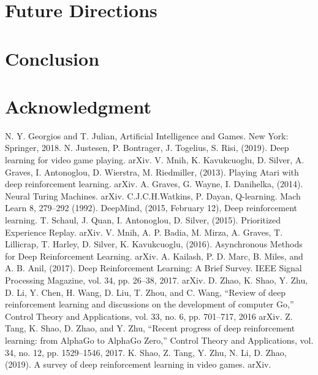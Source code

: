 \documentclass[conference]{IEEEtran}
\begin{document}
\section{Future Directions}


\section{Conclusion}


\section*{Acknowledgment}

\begin{thebibliography}{00}
      N. Y. Georgios and T. Julian, Artificial Intelligence and Games. New York: Springer, 2018.
      N. Justesen, P. Bontrager, J. Togelius, S. Risi, (2019). Deep learning for video game playing. arXiv.
      V. Mnih, K. Kavukcuoglu, D. Silver, A. Graves, I. Antonoglou, D. Wierstra, M. Riedmiller, (2013). Playing Atari with deep reinforcement learning. arXiv.
      A. Graves, G. Wayne, I. Danihelka, (2014). Neural Turing Machines. arXiv.
      C.J.C.H.Watkins, P. Dayan, Q-learning. Mach Learn 8, 279–292 (1992).
      DeepMind, (2015, February 12), Deep reinforcement learning.
      T. Schaul, J. Quan, I. Antonoglou, D. Silver, (2015). Prioritized Experience Replay. arXiv.
      V. Mnih, A. P. Badia, M. Mirza, A. Graves, T. Lillicrap, T. Harley, D. Silver, K. Kavukcuoglu, (2016). Asynchronous Methods for Deep Reinforcement Learning. arXiv.
      A. Kailash, P. D. Marc, B. Miles, and A. B. Anil, (2017). Deep Reinforcement Learning: A Brief Survey. IEEE Signal Processing Magazine, vol. 34, pp. 26–38, 2017. arXiv.
     D. Zhao,  K. Shao, Y. Zhu, D. Li, Y. Chen, H. Wang, D. Liu, T. Zhou, and C. Wang, “Review of deep reinforcement learning and discussions on the development of computer Go,” Control Theory and Applications, vol. 33, no. 6, pp. 701–717, 2016 arXiv.
     Z. Tang, K. Shao, D. Zhao, and Y. Zhu, “Recent progress of deep reinforcement learning: from AlphaGo to AlphaGo Zero,” Control Theory and Applications, vol. 34, no. 12, pp. 1529–1546, 2017.
     K. Shao, Z. Tang, Y. Zhu, N. Li, D. Zhao, (2019). A survey of deep reinforcement learning in video games. arXiv.
    

\end{thebibliography}
\end{document}

